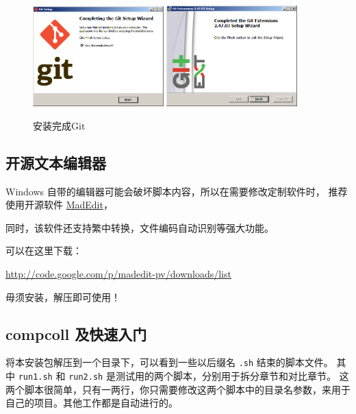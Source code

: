 \documentclass{article}
\begin{document}
\begin{figure}[ht]\centering
  \includegraphics[width=0.45\textwidth]{figures/git/set9-9.png}
  \includegraphics[width=0.45\textwidth]{figures/git/set10.png}
  \caption{安装完成Git}\label{fig:set9-9}
\end{figure}


\subsection{开源文本编辑器} \label{chap:madeditinstall}
Windows 自带的编辑器可能会破坏脚本内容，所以在需要修改定制软件时，
推荐使用开源软件 \href{http://code.google.com/p/madedit-pv/}{MadEdit}，

同时，该软件还支持繁中转换，文件编码自动识别等强大功能。

可以在这里下载：

\url{http://code.google.com/p/madedit-pv/downloads/list}

毋须安装，解压即可使用！



\cleardoublepage



\subsection{compcoll 及快速入门}

将本安装包解压到一个目录下，可以看到一些以后缀名 \texttt{.sh} 结束的脚本文件。
其中 \texttt{run1.sh} 和 \texttt{run2.sh} 是测试用的两个脚本，分别用于拆分章节和对比章节。
这两个脚本很简单，只有一两行，你只需要修改这两个脚本中的目录名参数，来用于自己的项目。其他工作都是自动进行的。
\end{document}
